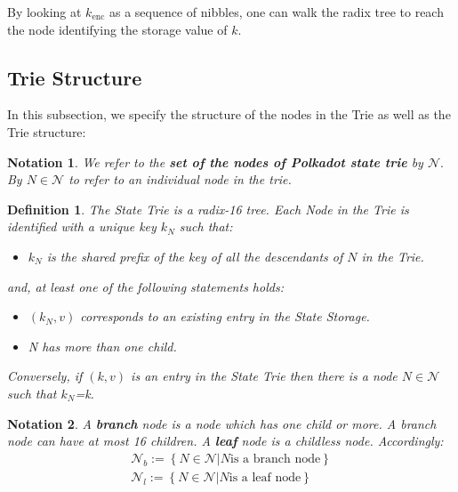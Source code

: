\documentclass{book}
\newcommand{\assign}{:=}
\newcommand{\tmop}[1]{\ensuremath{\operatorname{#1}}}
\newcommand{\tmstrong}[1]{\textbf{#1}}
\newcommand{\tmverbatim}[1]{{\ttfamily{#1}}}
\newenvironment{itemizeminus}{\begin{itemize} \renewcommand{\labelitemi}{$-$}\renewcommand{\labelitemii}{$-$}\renewcommand{\labelitemiii}{$-$}\renewcommand{\labelitemiv}{$-$}}{\end{itemize}}
\newtheorem{definition}{Definition}
\newtheorem{notation}{Notation}
\newtheorem{definition}{Definition}
\newtheorem{notation}{Notation}
\begin{document}
By looking at $k_{\tmop{enc}}$ as a sequence of nibbles, one can walk the
radix tree to reach the node identifying the storage value of $k$.

\subsection{Trie Structure}

In this subsection, we specify the structure of the nodes in the Trie as well
as the Trie structure:

\begin{notation}
  We refer to the {\tmstrong{set of the nodes of Polkadot state trie}} by
  $\mathcal{N}.$ By $N \in \mathcal{N}$ to refer to an individual node in the
  trie.
\end{notation}

\begin{definition}
  \label{defn-nodetype}The State Trie is a radix-16 tree. Each Node in the
  Trie is identified with a unique key $k_N$ such that:
  \begin{itemizeminus}
    \item $k_N$ is the shared prefix of the key of all the descendants of $N$
    in the Trie.
  \end{itemizeminus}
  and, at least one of the following statements holds:
  \begin{itemizeminus}
    \item $(k_N, v)$ corresponds to an existing entry in the State Storage.
    
    \item N has more than one child.
  \end{itemizeminus}
  \tmverbatim{}Conversely, if $(k, v)$ is an entry in the State Trie then
  there is a node $N \in \mathcal{N}$ such that $k_N$=k.
\end{definition}

\begin{notation}
  A {\tmstrong{branch}} node is a node which has one child or more. A branch
  node can have at most 16 children. A {\tmstrong{leaf}} node is a childless
  node. Accordingly:
  \[ \begin{array}{c}
       \mathcal{N}_b \assign \left\{ N \in \mathcal{N}|N \text{is a branch
       node} \right\}\\
       \mathcal{N}_l \assign \left\{ N \in \mathcal{N}|N \text{is a leaf node}
       \right\}
     \end{array} \]
\end{notation}
\end{document}
